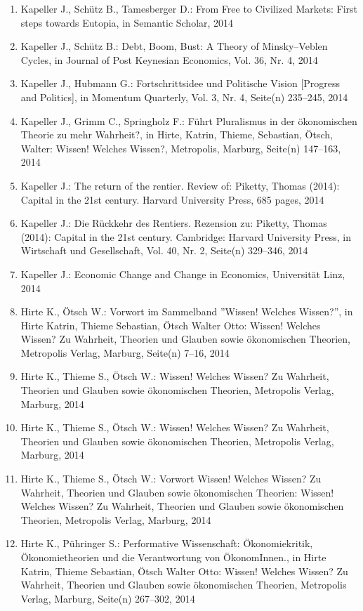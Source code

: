 \begin{enumerate}
	 \item Kapeller J., Schütz B., Tamesberger D.: From Free to Civilized Markets: First steps towards Eutopia, in Semantic Scholar, 2014
	 \item Kapeller J., Schütz B.: Debt, Boom, Bust: A Theory of Minsky--Veblen Cycles, in Journal of Post Keynesian Economics, Vol. 36, Nr. 4, 2014
	 \item Kapeller J., Hubmann G.: Fortschrittsidee und Politische Vision [Progress and Politics], in Momentum Quarterly, Vol. 3, Nr. 4, Seite(n) 235--245, 2014
	 \item Kapeller J., Grimm C., Springholz F.: Führt Pluralismus in der ökonomischen Theorie zu mehr Wahrheit?, in Hirte, Katrin, Thieme, Sebastian, Ötsch, Walter: Wissen! Welches Wissen?, Metropolis, Marburg, Seite(n) 147--163, 2014
	 \item Kapeller J.: The return of the rentier. Review of: Piketty, Thomas (2014): Capital in the 21st century. Harvard University Press, 685 pages, 2014
	 \item Kapeller J.: Die Rückkehr des Rentiers. Rezension zu: Piketty, Thomas (2014): Capital in the 21st century. Cambridge: Harvard University Press, in Wirtschaft und Gesellschaft, Vol. 40, Nr. 2, Seite(n) 329--346, 2014
	 \item Kapeller J.: Economic Change and Change in Economics, Universität Linz, 2014
	 \item Hirte K., Ötsch W.: Vorwort im Sammelband ''Wissen! Welches Wissen?'', in Hirte Katrin, Thieme Sebastian, Ötsch Walter Otto: Wissen! Welches Wissen? Zu Wahrheit, Theorien und Glauben sowie ökonomischen Theorien, Metropolis Verlag, Marburg, Seite(n) 7--16, 2014
	 \item Hirte K., Thieme S., Ötsch W.: Wissen! Welches Wissen? Zu Wahrheit, Theorien und Glauben sowie ökonomischen Theorien, Metropolis Verlag, Marburg, 2014
	 \item Hirte K., Thieme S., Ötsch W.: Wissen! Welches Wissen? Zu Wahrheit, Theorien und Glauben sowie ökonomischen Theorien, Metropolis Verlag, Marburg, 2014
	 \item Hirte K., Thieme S., Ötsch W.: Vorwort Wissen! Welches Wissen? Zu Wahrheit, Theorien und Glauben sowie ökonomischen Theorien: Wissen! Welches Wissen? Zu Wahrheit, Theorien und Glauben sowie ökonomischen Theorien, Metropolis Verlag, Marburg, 2014
	 \item Hirte K., Pühringer S.: Performative Wissenschaft: Ökonomiekritik, Ökonomietheorien und die Verantwortung von ÖkonomInnen., in Hirte Katrin, Thieme Sebastian, Ötsch Walter Otto: Wissen! Welches Wissen? Zu Wahrheit, Theorien und Glauben sowie ökonomischen Theorien, Metropolis Verlag, Marburg, Seite(n) 267--302, 2014

\end{enumerate}
